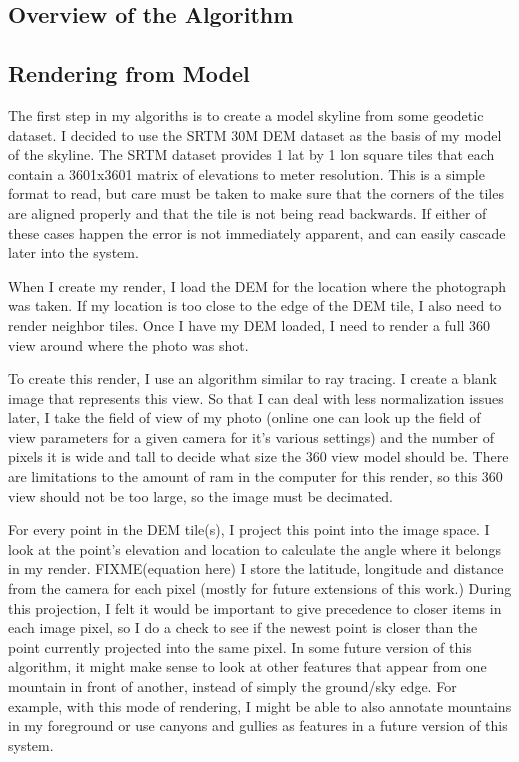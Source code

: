 \documentclass{acm_proc_article-sp}
\begin{document}
\subsection{Overview of the Algorithm}

\subsection{Rendering from Model}

The first step in my algoriths is to create a model skyline from some geodetic dataset.  I decided to use the  SRTM 30M DEM dataset as the basis of my model of the skyline.  The SRTM dataset provides 1 lat by 1 lon square tiles that each contain a 3601x3601 matrix of elevations to meter resolution. \cite{farr2007shuttle} This is a simple format to read, but care must be taken to make sure that the corners of the tiles are aligned properly and that the tile is not being read backwards. If either of these cases happen the error is not immediately apparent, and can easily cascade later into the system.  

When I create my render, I load the DEM for the location where the photograph was taken.   If my location is too close to the edge of the DEM tile, I also need to render  neighbor tiles.  Once I have my DEM loaded, I need to render a full 360 view around where the photo was shot.  

To create this render, I use an algorithm similar to ray tracing.  I create a blank image that represents this view.  So that I can deal with less normalization issues later, I take the field of view of my photo (online one can look up the field of view parameters for a given camera for it’s various settings) and the number of pixels it is wide and tall to decide what size the 360 view model should be.  There are limitations to the amount of ram in the computer for this render, so this 360 view should not be too large, so the image must be decimated.

For every point in the DEM tile(s), I project this point into the image space.  I look at the point’s elevation and location to calculate the angle where it belongs in my render.  FIXME(equation here) I store the latitude, longitude and distance from the camera for each pixel (mostly for future extensions of this work.) During this projection, I felt it would be important to give precedence to closer items in each image pixel, so I do a check to see if the newest point is closer than the point currently projected into the same pixel.  In some future version of this algorithm, it might make sense to look at other features that appear from one mountain in front of another, instead of simply the ground/sky edge. For example, with this mode of rendering, I might be able to also annotate mountains in my foreground or use canyons and gullies as features in a future version of this system.
\end{document}
